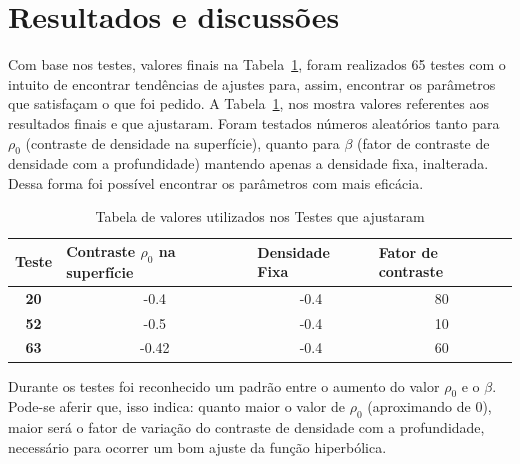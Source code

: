 \section{Resultados e discussões}
Com base nos testes, valores finais na Tabela~\ref{tabela 2}, foram realizados 65 testes com o intuito de encontrar tendências de ajustes para, assim, encontrar os parâmetros que satisfaçam o que foi pedido. A Tabela~\ref{tabela 2}, nos mostra valores referentes aos resultados finais e que ajustaram. Foram testados números aleatórios tanto para $\rho_0$ (contraste de densidade na superfície), quanto para $\beta$ (fator de contraste de densidade com a profundidade) mantendo apenas a densidade fixa, inalterada. Dessa forma foi possível encontrar os parâmetros com mais eficácia.

    \begin{table}[!h]
    \centering
    \begin{tabular}{|c|c|c|c|}
    \hline
    \multicolumn{1}{|l|}{\textbf{Teste}} & \multicolumn{1}{l|}{\textbf{Contraste $\rho_0$ na superfície}} & \multicolumn{1}{l|}{\textbf{Densidade Fixa}} & \multicolumn{1}{l|}{\textbf{Fator de contraste}} \\ \hline
    \textbf{20}                          & -0.4                                                & -0.4                                         & 80                                               \\ \hline
    \textbf{52}                          & -0.5                                               & -0.4                                         & 10                                               \\ \hline
    \textbf{63}                          & -0.42                                               & -0.4                                         & 60                                               \\ \hline
    \end{tabular}
    \caption{Tabela de valores utilizados nos Testes que ajustaram}
    \label{tabela 2}
    \end{table}


Durante os testes foi reconhecido um padrão entre o aumento do valor $\rho_0$ e o $\beta$. Pode-se aferir que, isso indica: quanto maior o valor de $\rho_0$ (aproximando de 0), maior será o fator de variação do contraste de densidade com a profundidade, necessário para ocorrer um bom ajuste da função hiperbólica.


